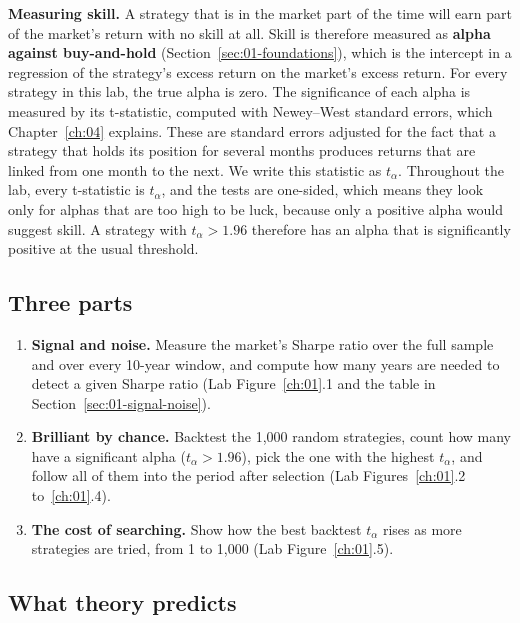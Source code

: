 \textbf{Measuring skill.} A strategy that is in the market part of the time will earn part of the market's return with no skill at all. Skill is therefore measured as \textbf{alpha against buy-and-hold} (Section~\ref{sec:01-foundations}), which is the intercept in a regression of the strategy's excess return on the market's excess return. For every strategy in this lab, the true alpha is zero. The significance of each alpha is measured by its t-statistic, computed with Newey--West standard errors, which Chapter~\ref{ch:04} explains. These are standard errors adjusted for the fact that a strategy that holds its position for several months produces returns that are linked from one month to the next. We write this statistic as $t_\alpha$. Throughout the lab, every t-statistic is $t_\alpha$, and the tests are one-sided, which means they look only for alphas that are too high to be luck, because only a positive alpha would suggest skill. A strategy with $t_\alpha > 1.96$ therefore has an alpha that is significantly positive at the usual threshold.

\subsection*{Three parts}

\begin{enumerate}
  \item \textbf{Signal and noise.} Measure the market's Sharpe ratio over the full sample and over every 10-year window, and compute how many years are needed to detect a given Sharpe ratio (Lab Figure~\ref{ch:01}.1 and the table in Section~\ref{sec:01-signal-noise}).
  \item \textbf{Brilliant by chance.} Backtest the 1,000 random strategies, count how many have a significant alpha ($t_\alpha > 1.96$), pick the one with the highest $t_\alpha$, and follow all of them into the period after selection (Lab Figures~\ref{ch:01}.2 to~\ref{ch:01}.4).
  \item \textbf{The cost of searching.} Show how the best backtest $t_\alpha$ rises as more strategies are tried, from 1 to 1,000 (Lab Figure~\ref{ch:01}.5).
\end{enumerate}

\subsection*{What theory predicts}

